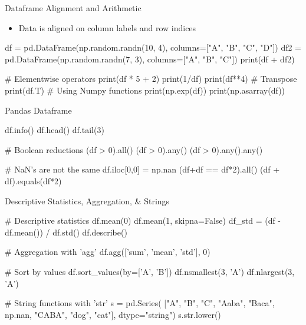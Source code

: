 \documentclass[ignorenonframetext,xcolor=x11names]{beamer}
\begin{document}
\begin{frame}[fragile]{Dataframe Alignment and Arithmetic}
\begin{itemize}
    \item Data is aligned on column labels and row indices
\end{itemize}
\footnotesize
\begin{pythoncode}
df = pd.DataFrame(np.random.randn(10, 4), 
                  columns=["A", "B", "C", "D"])
df2 = pd.DataFrame(np.random.randn(7, 3), 
                   columns=["A", "B", "C"])
print(df + df2)

# Elementwise operators
print(df * 5 + 2)
print(1/df)
print(df**4)
# Transpose
print(df.T)
# Using Numpy functions
print(np.exp(df))
print(np.asarray(df))
\end{pythoncode}
\end{frame}

\begin{frame}[fragile]{Pandas Dataframe}
\footnotesize
\begin{pythoncode}
df.info()
df.head()
df.tail(3)

# Boolean reductions
(df > 0).all()
(df > 0).any()
(df > 0).any().any()

# NaN's are not the same
df.iloc[0,0] = np.nan
(df+df == df*2).all()
(df + df).equals(df*2)
\end{pythoncode}
\end{frame}

\begin{frame}[fragile]{Descriptive Statistics, Aggregation, \& Strings}
\footnotesize
\begin{pythoncode}
# Descriptive statistics
df.mean(0)
df.mean(1, skipna=False)
df_std = (df - df.mean()) / df.std()
df.describe()

# Aggregation with 'agg'
df.agg(['sum', 'mean', 'std'], 0)

# Sort by values
df.sort_values(by=['A', 'B'])
df.nsmallest(3, 'A')
df.nlargest(3, 'A')

# String functions with 'str'
s = pd.Series(
    ["A", "B", "C", "Aaba", "Baca", np.nan, 
     "CABA", "dog", "cat"], dtype="string")
s.str.lower()
\end{pythoncode}
\end{frame}
\end{document}
